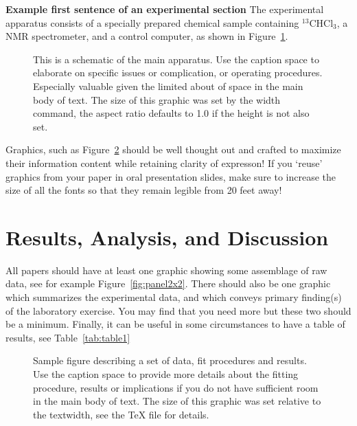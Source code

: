 \documentclass[aps,twocolumn,secnumarabic,nobalancelastpage,amsmath,amssymb,nofootinbib]{revtex4}
\begin{document}
{\bf Example first sentence of an experimental section}
The experimental apparatus consists of a specially prepared chemical
sample containing $^{13}$CHCl$_3$, a NMR spectrometer, and a control
computer, as shown in Figure~\ref{fig:samplefig}.

%
%
%

\begin{figure}
\caption{This is a schematic of the main apparatus.  Use the caption
space to elaborate on specific issues or complication, or operating
procedures.  Especially valuable given the limited about of space in
the main body of text.  The size of this graphic was set by the width
command, the aspect ratio defaults to 1.0 if the height is not also
set. \label{fig:samplefig}}
\end{figure}

Graphics, such as Figure~\ref{fig:calibration} should be well thought
out and crafted to maximize their information content while retaining
clarity of expresson!  If you `reuse' graphics from your paper in oral
presentation slides, make sure to increase the size of all the fonts
so that they remain legible from 20 feet away!


\section{Results, Analysis, and Discussion}

All papers should have at least one graphic showing some assemblage of
raw data, see for example Figure~\ref{fig:panel2x2}. There should also
be one graphic which summarizes the experimental data, and which
conveys primary finding(s) of the laboratory exercise.  You may find
that you need more but these two should be a minimum.  Finally, it can
be useful in some circumstances to have a table of results, see
Table~\ref{tab:table1}


\begin{figure}[h]
\caption{Sample figure describing a set of data, fit procedures and
results. Use the caption space to provide more details about the
fitting procedure, results or implications if you do not have
sufficient room in the main body of text.  The size of this graphic
was set relative to the textwidth, see the TeX file for details.}
\label{fig:calibration}
\end{figure}
\end{document}
